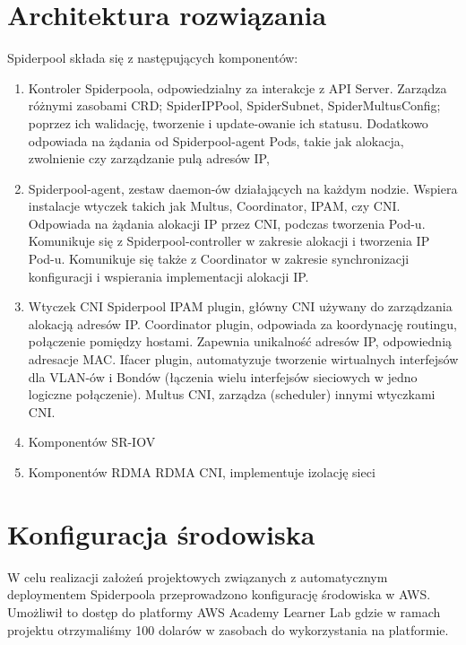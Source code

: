 \documentclass[onecolumn,12pt]{article}
\begin{document}
\section{Architektura rozwiązania}
Spiderpool składa się z następujących komponentów:
\begin{enumerate}
    \item Kontroler Spiderpoola, odpowiedzialny za interakcje z API Server. Zarządza różnymi zasobami CRD; SpiderIPPool, SpiderSubnet, SpiderMultusConfig; poprzez ich walidację, tworzenie i update-owanie ich statusu. Dodatkowo odpowiada na żądania od Spiderpool-agent Pods, takie jak alokacja, zwolnienie czy zarządzanie pulą adresów IP, 
    \item Spiderpool-agent, zestaw daemon-ów działających na każdym nodzie. Wspiera instalacje wtyczek takich jak Multus, Coordinator, IPAM, czy CNI. Odpowiada na żądania alokacji IP przez CNI, podczas tworzenia Pod-u. Komunikuje się z Spiderpool-controller w zakresie alokacji i tworzenia IP Pod-u. Komunikuje się także z Coordinator w zakresie synchronizacji konfiguracji i wspierania implementacji alokacji IP.
    \item Wtyczek CNI
    \newline Spiderpool IPAM plugin, główny CNI używany do zarządzania alokacją adresów IP.
    \newline Coordinator plugin, odpowiada za koordynację routingu, połączenie pomiędzy hostami. Zapewnia unikalność adresów IP, odpowiednią adresacje MAC.
    \newline Ifacer plugin, automatyzuje tworzenie wirtualnych interfejsów dla VLAN-ów i Bondów (łączenia wielu interfejsów sieciowych w jedno logiczne połączenie).
    \newline Multus CNI, zarządza (scheduler) innymi wtyczkami CNI.
    \item Komponentów SR-IOV
    \item Komponentów RDMA
    \newline RDMA CNI, implementuje izolację sieci
\end{enumerate}


\section{Konfiguracja środowiska}

W celu realizacji założeń projektowych związanych z automatycznym deploymentem Spiderpoola 
przeprowadzono konfigurację środowiska w AWS. Umożliwił to dostęp do platformy AWS Academy Learner Lab 
gdzie w ramach projektu otrzymaliśmy 100 dolarów w zasobach do wykorzystania na platformie. 
\end{document}
